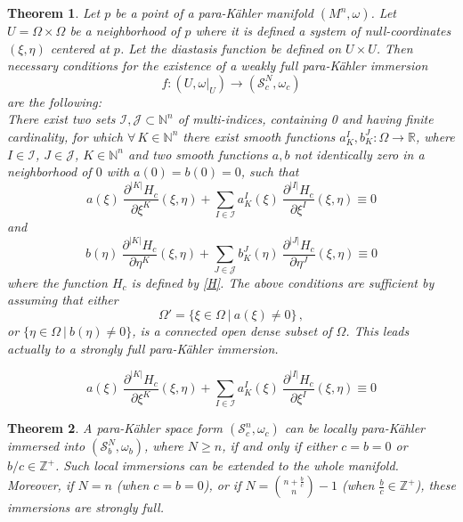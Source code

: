 \documentclass[10pt,a4paper]{amsart}
\newtheorem{thm}{Theorem}
\newcommand{\I}{\mathcal{I}}
\newcommand{\J}{\mathcal{J}}
\newcommand{\N}{\mathds{N}}
\newcommand{\R}{\mathds{R}}
\newcommand{\Z}{\mathds{Z}}
\newcommand{\de}{\partial}
\newcommand{\pk}{para-K\"ahler }
\newcommand{\s}{\mathcal{S}}
\begin{document}
\begin{thm}\label{main}
Let $p$ be a point of a \pk manifold $(M^n,\omega)$. Let $U=\Omega\times\Omega$ be a neighborhood of $p$ where it is defined a system of null-coordinates $(\xi,\eta)$ centered at $p$. Let the diastasis function be defined on $U\times U$.
Then  necessary conditions for the existence of a  weakly  full \pk immersion 
$$f: (U,\omega|_U)\to (\s_c^N,\omega_c)$$
are the following:\\
There exist two sets  $\I,\J\subset \N^n$ of multi-indices, containing 0 and having finite cardinality, for which $\forall\, K\in\N^n$ there exist
smooth functions $a^I_K, b^J_K:\Omega \to\R $, where $I\in\I$, $J\in\J$, $K\in\N^n$ and two  smooth functions 
$a, b$ not identically zero in a neighborhood  of $0$ with $a(0)=b(0)=0$, 
such that
\begin{equation}\label{dip1}
a(\xi)\ \frac{\de^{|K|}H_c}{{\de\xi^{K}}}(\xi,\eta) + \sum_{I\in\I} a^I_K(\xi)\   \frac{\de^{|I|}H_c}{\de\xi^{I}} (\xi,\eta) \equiv 0 
\end{equation}
and
\begin{equation}\label{dip2}
b(\eta)\ \frac{\de^{|K|}H_c}{{\de\eta^{K}}}(\xi,\eta) + \sum_{J\in\J} b^J_K(\eta)\   \frac{\de^{|J|}H_c}{\de\eta^{J}} (\xi,\eta) \equiv 0
\end{equation}
where the function $H_c$ is defined by \eqref{H}.  The above conditions are sufficient by assuming that either \begin{equation}\label{eq:A}
\Omega'=\big\{\xi\in\Omega\ | \ a(\xi)\neq 0\big\}\,,
\end{equation}
or $\big\{\eta\in\Omega\ | \ b(\eta)\neq 0\big\}$,
is a connected  open dense subset of $\Omega$. This leads actually to a strongly full \pk immersion.
\end{thm}

\begin{equation}
a(\xi)\ \frac{\de^{|K|}H_c}{{\de\xi^{K}}}(\xi,\eta) + \sum_{I\in\I} a^I_K(\xi)\   \frac{\de^{|I|}H_c}{\de\xi^{I}} (\xi,\eta) \equiv 0 
\end{equation}

\begin{thm}
A \pk space form $(\s_c^n,\omega_c)$ can be locally \pk immersed into $(\s_b^N,\omega_b)$, where $N\geq n$, if and only if either $c=b=0$ or $b/c\in\Z^+$. Such local immersions can be extended to the whole manifold. Moreover, if
$N=n$ (when $c=b=0$), or if $N =\binom{n+\frac{b}{c}}{n}-1$ (when $\frac{b}{c}\in\Z^+$), these immersions are strongly full.
\end{thm}
\end{document}
